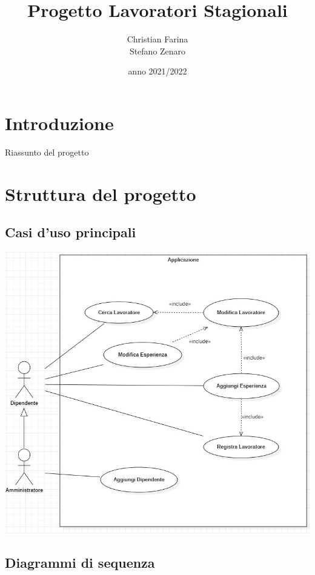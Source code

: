 \documentclass[ 4paper,11pt,openany]{book}
\title{Progetto Lavoratori Stagionali}
\author{Christian Farina \\  Stefano Zenaro}
\date{anno 2021/2022}
\begin{document}
\frontmatter
\maketitle
\tableofcontents 

\mainmatter
\chapter{Introduzione}
Riassunto del progetto
 
\chapter{Struttura del progetto}%
\section{Casi d'uso principali}
\includegraphics[width=180mm]{casi.jpg}
\section{Diagrammi di sequenza}
\end{document}
